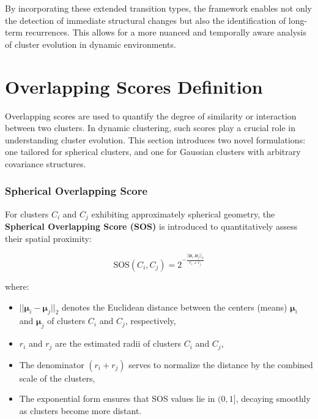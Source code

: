 By incorporating these extended transition types, the framework enables not
only the detection of immediate structural changes but also the identification
of long-term recurrences. This allows for a more nuanced and temporally aware
analysis of cluster evolution in dynamic environments.

\section{Overlapping Scores Definition}\label{sec:overlapping_scores}
Overlapping scores are used to quantify the degree of similarity or interaction
between two clusters. In dynamic clustering, such scores play a crucial role in
understanding cluster evolution. This section introduces two novel
formulations: one tailored for spherical clusters, and one for Gaussian
clusters with arbitrary covariance structures.

\subsubsection*{Spherical Overlapping Score}

For clusters $ C_i $ and $ C_j $ exhibiting approximately spherical geometry,
the \textbf{Spherical Overlapping Score (SOS)} is introduced to quantitatively
assess their spatial proximity:

\begin{equation}\label{eq:sos}
      \text{SOS}(C_i, C_j) = 2^{- \frac{||\boldsymbol{\mu}_i, \boldsymbol{\mu}_j||_2}{r_i + r_j}}
\end{equation}

where:
\begin{itemize}
      \item $||\boldsymbol{\mu}_i - \boldsymbol{\mu}_j||_2$ denotes the Euclidean distance between the centers
            (means) $\boldsymbol{\mu}_i$ and $\boldsymbol{\mu}_j$ of clusters $C_i$ and $C_j$, respectively,
      \item $r_i$ and $r_j$ are the estimated radii of clusters $C_i$ and $C_j$,
      \item The denominator $(r_i + r_j)$ serves to normalize the distance by the combined
            scale of the clusters,
      \item The exponential form ensures that SOS values lie in $(0, 1]$, decaying smoothly
            as clusters become more distant.
\end{itemize}

